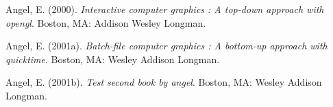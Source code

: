 \documentclass[12pt,twoside]{reedthesis}
\begin{document}
\setlength{\parindent}{-0.20in}
\setlength{\leftskip}{0.20in}
\setlength{\parskip}{8pt}

\hypertarget{refs}{}
\leavevmode\hypertarget{ref-angel2000}{}%
Angel, E. (2000). \emph{Interactive computer graphics : A top-down approach with opengl}. Boston, MA: Addison Wesley Longman.

\leavevmode\hypertarget{ref-angel2001}{}%
Angel, E. (2001a). \emph{Batch-file computer graphics : A bottom-up approach with quicktime}. Boston, MA: Wesley Addison Longman.

\leavevmode\hypertarget{ref-angel2002a}{}%
Angel, E. (2001b). \emph{Test second book by angel}. Boston, MA: Wesley Addison Longman.


\end{document}
